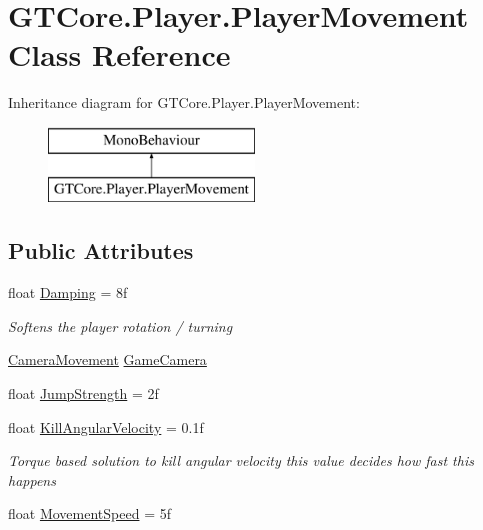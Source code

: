\hypertarget{class_g_t_core_1_1_player_1_1_player_movement}{}\section{G\+T\+Core.\+Player.\+Player\+Movement Class Reference}
\label{class_g_t_core_1_1_player_1_1_player_movement}
Inheritance diagram for G\+T\+Core.\+Player.\+Player\+Movement\+:\begin{figure}[H]
\begin{center}
\leavevmode
\includegraphics[height=2.000000cm]{class_g_t_core_1_1_player_1_1_player_movement}
\end{center}
\end{figure}
\subsection*{Public Attributes}
\begin{DoxyCompactItemize}
\item 
float \hyperlink{class_g_t_core_1_1_player_1_1_player_movement_a56441c76eefb5daef3c5c975d0a47e82}{Damping} = 8f
\begin{DoxyCompactList}\small\item\em Softens the player rotation / turning \end{DoxyCompactList}\item 
\hyperlink{class_g_t_core_1_1_camera_1_1_camera_movement}{Camera\+Movement} \hyperlink{class_g_t_core_1_1_player_1_1_player_movement_aeaee3024bab44f3ddef8312a2c13a31d}{Game\+Camera}
\item 
float \hyperlink{class_g_t_core_1_1_player_1_1_player_movement_acbd313912a6eda65aed7bd5a393ad1d9}{Jump\+Strength} = 2f
\item 
float \hyperlink{class_g_t_core_1_1_player_1_1_player_movement_a6b3a8ba0b37c65e7f364c6c2179b7789}{Kill\+Angular\+Velocity} = 0.\+1f
\begin{DoxyCompactList}\small\item\em Torque based solution to kill angular velocity this value decides how fast this happens \end{DoxyCompactList}\item 
float \hyperlink{class_g_t_core_1_1_player_1_1_player_movement_a37f2a584513b960296a50e17777cb491}{Movement\+Speed} = 5f
\end{DoxyCompactItemize}


